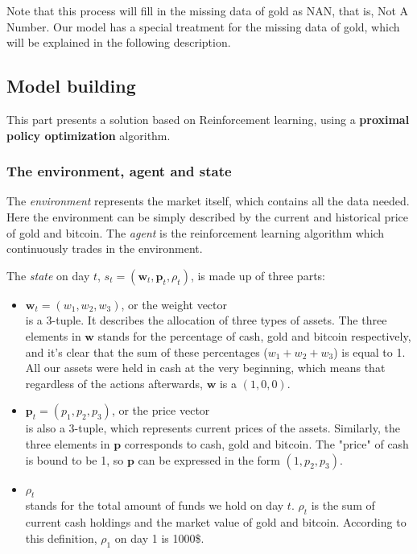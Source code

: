 \documentclass{mcmthesis}
\begin{document}
Note that this process will fill in the missing data of gold as NAN, that is, Not A Number. Our model has a special treatment for the missing data of gold, which will be explained in the following description.


\subsection{Model building}

This part presents a solution based on Reinforcement learning,
using a \textbf{proximal policy optimization} algorithm.

\subsubsection{The environment, agent and state}

The \textit{environment} represents the market itself,
which contains all the data needed.
Here the environment can be simply described
by the current and historical price of gold and bitcoin.
The \textit{agent} is the reinforcement learning algorithm which
continuously trades in the environment.

The \textit{state} on day $t$, $s_t = (\pmb{w}_t, \pmb{p}_t, \rho _t)$, is made up of three parts:

\begin{itemize}
  \item $\pmb{w}_t = (w_1, w_2, w_3)$, or the weight vector \\is a 3-tuple.
  It describes the allocation of three types of assets.
  The three elements in $\pmb{w}$ stands for the percentage of cash, gold and bitcoin respectively,
  and it's clear that the sum of these percentages ($w_1+w_2+w_3$) is equal to 1.\\
  All our assets were held in cash at the very beginning,
  which means that regardless of the actions afterwards,
  $\pmb{w}$ is a $(1,0,0)$.

  \item $\pmb{p}_t = (p_1, p_2, p_3)$, or the price vector \\ is also a 3-tuple,
  which represents current prices of the assets.
  Similarly, the three elements in $\pmb{p}$ corresponds to cash, gold and bitcoin.
  The "price" of cash is bound to be 1,
  so $\pmb{p}$ can be expressed in the form $(1,p_2,p_3)$.

  \item $\rho _t$\\
  stands for the total amount of funds we hold on day $t$.
  $\rho _t$ is the sum of current cash holdings and the market value of gold and bitcoin.
  According to this definition, $\rho _1$ on day 1 is 1000\$.
\end{itemize}
\end{document}

